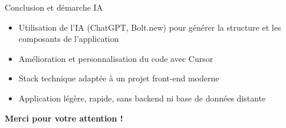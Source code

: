 \documentclass{beamer}
\begin{document}
\begin{frame}{Conclusion et démarche IA}
\begin{itemize}
  \item Utilisation de l'IA (ChatGPT, Bolt.new) pour générer la structure et les composants de l'application
  \item Amélioration et personnalisation du code avec Cursor
  \item Stack technique adaptée à un projet front-end moderne
  \item Application légère, rapide, sans backend ni base de données distante
\end{itemize}
\vspace{1em}
\textbf{Merci pour votre attention !}
\end{frame}
\end{document}
